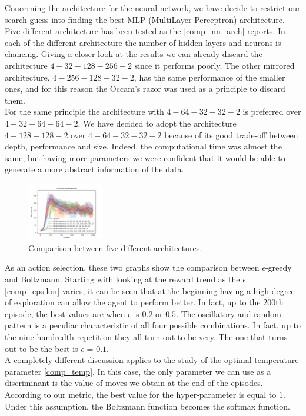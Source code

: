 \documentclass{article}
\begin{document}
   Concerning the architecture for the neural network, we have decide to restrict our search guess into finding the best MLP (MultiLayer Perceptron) architecture.
   Five different architecture has been tested as the \autoref{comp_nn_arch} reports. 
   In each of the different architecture the number of hidden layers and neurons is chancing. 
   Giving a closer look at the results we can already discard the architecture $4-32-128-256-2$ since it performs poorly. 
   The other mirrored architecture, $4-256-128-32-2$, has the same performance of the smaller ones, and for this reason the Occam's razor was used as a principle to discard them.\\
   For the same principle the architecture with $4-64-32-32-2$ is preferred over $4-32-64-64-2$. 
   We have decided to adopt the architecture $4-128-128-2$ over $4-64-32-32-2$ because of its good trade-off between depth, performance and size. 
   Indeed, the computational time was almost the same, but having more parameters we were confident that it would be able to generate a more abstract information of the data.\\
   \begin{figure}[ht!]
      \centering
      \includegraphics[width=0.3\textwidth]{assets/fig_hp/nn_architecture.png}
      \caption{Comparison between five different architectures. 
      }
      \label{comp_nn_arch}
   \end{figure}

   As an action selection, these two graphs show the comparison between $\epsilon$-greedy and Boltzmann. 
   Starting with looking at the reward trend as the $\epsilon$ \autoref{comp_epsilon} varies, 
   it can be seen that at the beginning having a high degree of exploration can allow the agent to perform better. 
   In fact, up to the 200th episode, the best values are when $\epsilon$ is $0.2$ or $0.5$.  
   The oscillatory and random pattern is a peculiar characteristic of all four possible combinations. 
   In fact, up to the nine-hundredth repetition they all turn out to be very. 
   The one that turns out to be the best is $\epsilon$ = $0.1$.\\
   A completely different discussion applies to the study of the optimal temperature parameter \autoref{comp_temp}. 
   In this case, the only parameter we can use as a discriminant is the value of moves we obtain at the end of the episodes. 
   According to our metric, the best value for the hyper-parameter is equal to $1$. Under this assumption, the Boltzmann function becomes the softmax function. 
\end{document}
